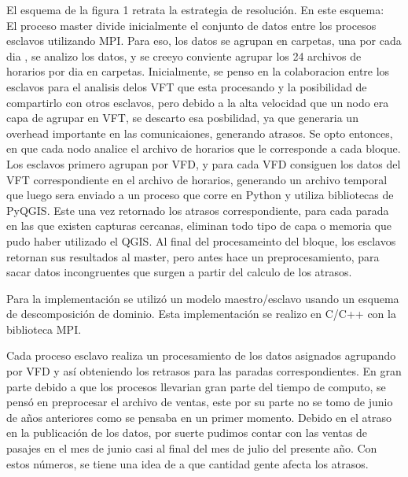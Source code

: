 \documentclass[journal]{IEEEtran}
\begin{document}
El esquema de la figura 1 retrata la estrategia de resolución. En este esquema:\\
El proceso master divide inicialmente el conjunto de datos entre los procesos esclavos utilizando MPI. Para eso, los datos se agrupan en carpetas, una por cada dia , se analizo los datos, y se creeyo conviente agrupar los 24 archivos de horarios por dia en carpetas. Inicialmente, se penso en la colaboracion entre los esclavos para el analisis delos VFT que esta procesando y la posibilidad de compartirlo con otros esclavos, pero debido a la alta velocidad que un nodo era capa de agrupar en VFT, se descarto esa posbilidad, ya que generaria un overhead importante en las comunicaiones, generando atrasos. Se opto entonces, en que cada nodo analice el archivo de horarios que le corresponde a cada bloque. 
Los esclavos primero agrupan por VFD, y para cada VFD consiguen los datos del VFT correspondiente en el archivo de horarios, generando un archivo temporal que luego sera enviado a un proceso que corre en Python y utiliza bibliotecas de PyQGIS. Este una vez retornado los atrasos correspondiente, para cada parada en las que existen capturas cercanas, eliminan todo tipo de capa o memoria que pudo haber utilizado el QGIS.
Al final del procesameinto del bloque, los esclavos retornan sus resultados al master, pero antes hace un preprocesamiento, para sacar datos incongruentes que surgen a partir del calculo de los atrasos. 

Para la implementación se utilizó un modelo maestro/esclavo usando un esquema de descomposición de dominio. Esta implementación se realizo  en C/C++ con la biblioteca MPI.

Cada proceso esclavo realiza un procesamiento de los datos asignados agrupando por VFD y así obteniendo los retrasos para las paradas correspondientes. En gran parte debido a que los procesos llevarian gran parte del tiempo de computo, se pensó en preprocesar el archivo de ventas, este por su parte no se tomo de junio de años anteriores como se pensaba en un primer momento.  Debido en el atraso en la publicación de los datos, por suerte pudimos contar con las ventas de pasajes en el mes de junio casi al final del mes de julio del presente año. Con estos números, se tiene una idea de a que cantidad gente afecta los atrasos.
\end{document}
